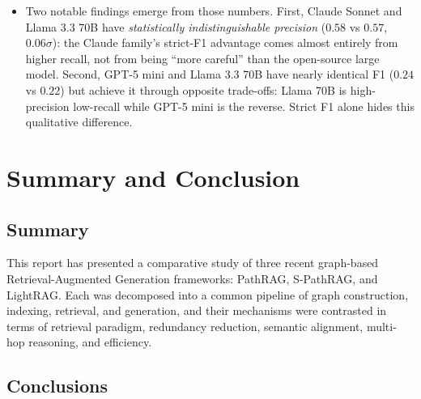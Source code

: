 \documentclass[12pt,a4paper,oneside]{report}
\begin{document}
\begin{itemize}[leftmargin=2em,itemsep=2pt]
          Opus vs GPT-5 mini, GPT-5 mini vs Llama 3.3 70B) fall
          below $2\sigma$ and cannot be distinguished from sampling
          noise on this dataset.
    \item Two notable findings emerge from those numbers. First,
          Claude Sonnet and Llama 3.3 70B have \emph{statistically
          indistinguishable precision} ($0.58$ vs $0.57$,
          $0.06\sigma$): the Claude family's strict-F1 advantage
          comes almost entirely from higher recall, not from being
          ``more careful'' than the open-source large model. Second,
          GPT-5 mini and Llama 3.3 70B have nearly identical F1
          ($0.24$ vs $0.22$) but achieve it through opposite
          trade-offs: Llama 70B is high-precision low-recall while
          GPT-5 mini is the reverse. Strict F1 alone hides this
          qualitative difference.
\end{itemize}

\chapter{Summary and Conclusion}
\label{ch:conclusion}

\section{Summary}

This report has presented a comparative study of three recent graph-based
Retrieval-Augmented Generation frameworks: PathRAG, S-PathRAG, and LightRAG.
Each was decomposed into a common pipeline of graph construction, indexing,
retrieval, and generation, and their mechanisms were contrasted in terms of
retrieval paradigm, redundancy reduction, semantic alignment, multi-hop
reasoning, and efficiency.

\section{Conclusions}
\end{document}
